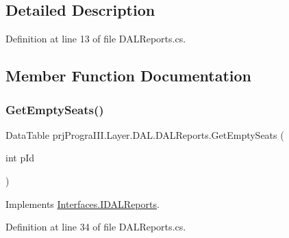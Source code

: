\subsection{Detailed Description}


Definition at line 13 of file D\+A\+L\+Reports.\+cs.



\subsection{Member Function Documentation}
\hypertarget{classprj_progra_i_i_i_1_1_layer_1_1_d_a_l_1_1_d_a_l_reports_aac3d2267dc8f67b5b83d3df0c6ce1991}{}\label{classprj_progra_i_i_i_1_1_layer_1_1_d_a_l_1_1_d_a_l_reports_aac3d2267dc8f67b5b83d3df0c6ce1991} 
\subsubsection{\texorpdfstring{Get\+Empty\+Seats()}{GetEmptySeats()}}
{\footnotesize\ttfamily Data\+Table prj\+Progra\+I\+I\+I.\+Layer.\+D\+A\+L.\+D\+A\+L\+Reports.\+Get\+Empty\+Seats (\begin{DoxyParamCaption}\item[{int}]{p\+Id }\end{DoxyParamCaption})}



Implements \hyperlink{interface_interfaces_1_1_i_d_a_l_reports_aae14fd24724e5b09d6c577805b79262a}{Interfaces.\+I\+D\+A\+L\+Reports}.



Definition at line 34 of file D\+A\+L\+Reports.\+cs.

